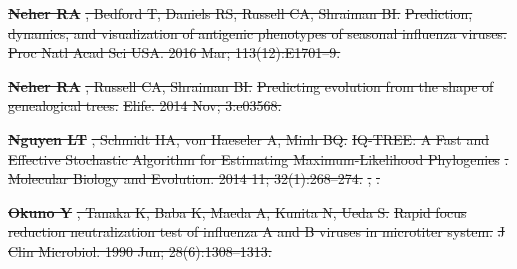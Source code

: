\documentclass[9pt,lineno]{elife} %
\providecommand{\DIFdel}[1]{{\protect\color{red}\sout{#1}}}                      %
\providecommand{\DIFdeltex}[1]{{\protect\color{red}\sout{#1}}}                      %
\providecommand{\DIFdel}[1]{\texorpdfstring{\DIFdeltex{#1}}{}} %
\begin{document}
\textbf{%
\DIFdel{Neher RA}}%
\DIFdel{, Bedford T, Daniels RS, Russell CA,
  Shraiman BI.
}%
\DIFdel{Prediction, dynamics, and visualization of antigenic phenotypes of
  seasonal influenza viruses.}%
\DIFdel{Proc Natl Acad Sci USA.  2016 Mar; 113(12):E1701--9.
}%

\textbf{%
\DIFdel{Neher RA}}%
\DIFdel{, Russell CA, Shraiman BI.
}%
\DIFdel{Predicting evolution from the shape of genealogical trees.}%
\DIFdel{Elife.  2014 Nov; 3:e03568.
}%

\textbf{%
\DIFdel{Nguyen LT}}%
\DIFdel{, Schmidt HA, von Haeseler A, Minh
  BQ.
}%
\DIFdel{IQ-TREE: A Fast and Effective Stochastic Algorithm for Estimating
  Maximum-Likelihood Phylogenies}%
\DIFdel{.
}%
\DIFdel{Molecular Biology and Evolution.  2014 11; 32(1):268--274.
}%
\DIFdel{,
  }%
\DIFdel{.
}%

\textbf{%
\DIFdel{Okuno Y}}%
\DIFdel{, Tanaka K, Baba K, Maeda A, Kunita N,
  Ueda S.
}%
\DIFdel{Rapid focus reduction neutralization test of influenza A and B
  viruses in microtiter system.}%
\DIFdel{J Clin Microbiol.  1990 Jun; 28(6):1308--1313.
}%
\end{document}

